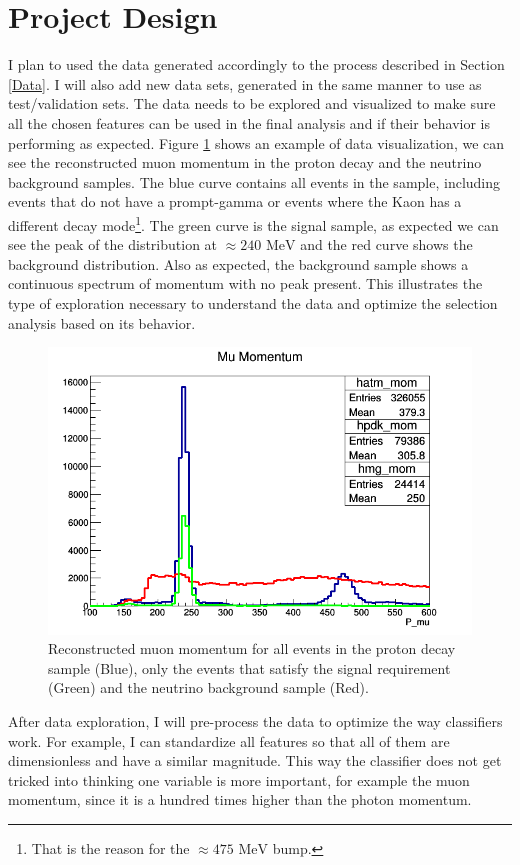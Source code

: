 
\section{Project Design}

I plan to used the data generated accordingly to the process described in Section \ref{Data}. I will also add new data sets, generated in the same manner to use as test/validation sets. The data needs to be explored and visualized to make sure all the chosen features can be used in the final analysis and if their behavior is performing as expected. Figure \ref{fig:mom} shows an example of data visualization, we can see the reconstructed muon momentum in the proton decay and the neutrino background samples. The blue curve contains all events in the sample, including events that do not have a prompt-gamma or events where the Kaon has a different decay mode\footnote{That is the reason for the $\approx 475 \textrm{ MeV}$ bump.}. The green curve is the signal sample, as expected we can see the peak of the distribution at $\approx 240 \textrm{ MeV}$ and the red curve shows the background distribution. Also as expected, the background sample shows a continuous spectrum of momentum with no peak present. This illustrates the type of exploration necessary to understand the data and optimize the selection analysis based on its behavior.

\begin{figure}[h]
  \centering
  \includegraphics[width=0.6\linewidth]{figs/mom.png}
  \caption{Reconstructed muon momentum for all events in the proton decay sample (Blue), only the events that satisfy the signal requirement (Green) and the neutrino background sample (Red).}
  \label{fig:mom}
\end{figure}

After data exploration, I will pre-process the data to optimize the way classifiers work. For example, I can standardize all features so that all of them are dimensionless and have a similar magnitude. This way the classifier does not get tricked into thinking one variable is more important, for example the muon momentum, since it is a hundred times higher than the photon momentum.

